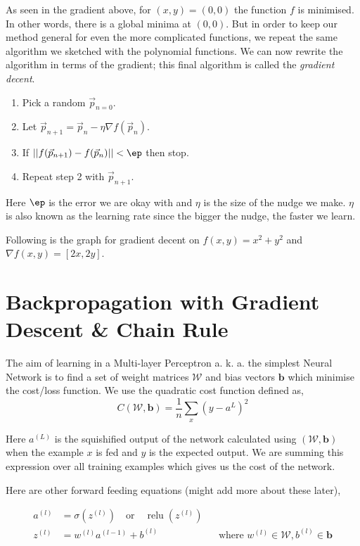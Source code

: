 \documentclass{homework}
\begin{document}
As seen in the gradient above, for $(x, y) = (0, 0)$ the function $f$ is minimised. In other words, there is a global minima at $(0, 0)$. But in order to keep our method general for even the more complicated functions, we repeat the same algorithm we sketched with the polynomial functions. We can now rewrite the algorithm in terms of the gradient; this final algorithm is called the \textit{gradient decent}.

\begin{enumerate}
  \item Pick a random $\vec{p}_{n=0}$.
  \item Let $\vec{p}_{n+1} = \vec{p}_{n} - \eta \nabla f(\vec{p}_n)$.
  \item If $||f(\vec{p}_{n+1}) - f(\vec{p}_{n})|| < \ep$ then stop.
  \item Repeat step 2 with $\vec{p}_{n+1}$.
\end{enumerate}

Here $\ep$ is the error we are okay with and $\eta$ is the size of the nudge we make. $\eta$ is also known as the learning rate since the bigger the nudge, the faster we learn.

Following is the graph for gradient decent on $f(x, y) = x^2 + y^2$ and $\nabla f(x, y) = [2x, 2y]$.


\section{Backpropagation with Gradient Descent \& Chain Rule}

The aim of learning in a Multi-layer Perceptron a. k. a. the simplest Neural Network is to find a set of weight matrices $\mathcal W$ and bias vectors $\mathbf b$ which minimise the cost/loss function. We use the quadratic cost function defined as,
\[
  C(\mathcal W, \mathbf b) = \frac{1}{n} \sum_x(y-a^L)^2
\]

Here $a^{(L)}$ is the squishified output of the network calculated using $(\mathcal W, \mathbf b)$ when the example $x$ is fed and $y$ is the expected output. We are summing this expression over all training examples which gives us the cost of the network.

Here are other forward feeding equations (might add more about these later),

\begin{align*}
  a^{(l)} & = \sigma(z^{(l)}) \quad \text{or} \quad \operatorname{relu}(z^{(l)}) \\
  z^{(l)} & = w^{(l)} a^{(l-1)}+b^{(l)} && \text{where } w^{(l)} \in \mathcal W, b^{(l)} \in \mathbf b 
\end{align*}
\end{document}
